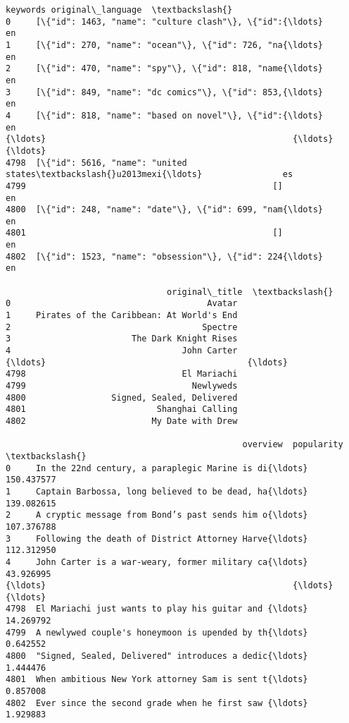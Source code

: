 \documentclass[11pt]{article}
\begin{document}
\begin{tcolorbox}[breakable, size=fbox, boxrule=.5pt, pad at break*=1mm, opacityfill=0]
\begin{Verbatim}[commandchars=\\\{\}]
                                               keywords original\_language  \textbackslash{}
0     [\{"id": 1463, "name": "culture clash"\}, \{"id":{\ldots}                en
1     [\{"id": 270, "name": "ocean"\}, \{"id": 726, "na{\ldots}                en
2     [\{"id": 470, "name": "spy"\}, \{"id": 818, "name{\ldots}                en
3     [\{"id": 849, "name": "dc comics"\}, \{"id": 853,{\ldots}                en
4     [\{"id": 818, "name": "based on novel"\}, \{"id":{\ldots}                en
{\ldots}                                                 {\ldots}               {\ldots}
4798  [\{"id": 5616, "name": "united states\textbackslash{}u2013mexi{\ldots}                es
4799                                                 []                en
4800  [\{"id": 248, "name": "date"\}, \{"id": 699, "nam{\ldots}                en
4801                                                 []                en
4802  [\{"id": 1523, "name": "obsession"\}, \{"id": 224{\ldots}                en

                                original\_title  \textbackslash{}
0                                       Avatar
1     Pirates of the Caribbean: At World's End
2                                      Spectre
3                        The Dark Knight Rises
4                                  John Carter
{\ldots}                                        {\ldots}
4798                               El Mariachi
4799                                 Newlyweds
4800                 Signed, Sealed, Delivered
4801                          Shanghai Calling
4802                         My Date with Drew

                                               overview  popularity  \textbackslash{}
0     In the 22nd century, a paraplegic Marine is di{\ldots}  150.437577
1     Captain Barbossa, long believed to be dead, ha{\ldots}  139.082615
2     A cryptic message from Bond’s past sends him o{\ldots}  107.376788
3     Following the death of District Attorney Harve{\ldots}  112.312950
4     John Carter is a war-weary, former military ca{\ldots}   43.926995
{\ldots}                                                 {\ldots}         {\ldots}
4798  El Mariachi just wants to play his guitar and {\ldots}   14.269792
4799  A newlywed couple's honeymoon is upended by th{\ldots}    0.642552
4800  "Signed, Sealed, Delivered" introduces a dedic{\ldots}    1.444476
4801  When ambitious New York attorney Sam is sent t{\ldots}    0.857008
4802  Ever since the second grade when he first saw {\ldots}    1.929883


\end{Verbatim}
\end{tcolorbox}
\end{document}
